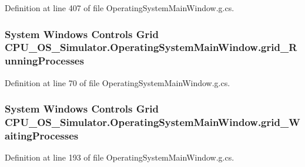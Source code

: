 Definition at line 407 of file Operating\+System\+Main\+Window.\+g.\+cs.

\hypertarget{class_c_p_u___o_s___simulator_1_1_operating_system_main_window_a628b5d00213f20c361f776b85b3f7115}{}
\subsubsection[{grid\+\_\+\+Running\+Processes}]{\setlength{\rightskip}{0pt plus 5cm}System Windows Controls Grid C\+P\+U\+\_\+\+O\+S\+\_\+\+Simulator.\+Operating\+System\+Main\+Window.\+grid\+\_\+\+Running\+Processes\hspace{0.3cm}{\ttfamily [package]}}\label{class_c_p_u___o_s___simulator_1_1_operating_system_main_window_a628b5d00213f20c361f776b85b3f7115}


Definition at line 70 of file Operating\+System\+Main\+Window.\+g.\+cs.

\hypertarget{class_c_p_u___o_s___simulator_1_1_operating_system_main_window_afdd9d749d58fde066217f035ac2c46c4}{}
\subsubsection[{grid\+\_\+\+Waiting\+Processes}]{\setlength{\rightskip}{0pt plus 5cm}System Windows Controls Grid C\+P\+U\+\_\+\+O\+S\+\_\+\+Simulator.\+Operating\+System\+Main\+Window.\+grid\+\_\+\+Waiting\+Processes\hspace{0.3cm}{\ttfamily [package]}}\label{class_c_p_u___o_s___simulator_1_1_operating_system_main_window_afdd9d749d58fde066217f035ac2c46c4}


Definition at line 193 of file Operating\+System\+Main\+Window.\+g.\+cs.

